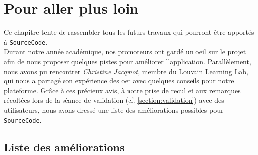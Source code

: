 \chapter{Pour aller plus loin}
\label{chapter:pourAllerPlusLoin}

Ce chapitre tente de rassembler tous les futurs travaux qui pourront être apportés à \texttt{SourceCode}.\\

Durant notre année académique, nos promoteurs ont gardé un oeil sur le projet afin de nous proposer quelques pistes pour améliorer l'application.
Parallèlement, nous avons pu rencontrer \textit{Christine Jacqmot}, membre du Louvain Learning Lab, qui nous a partagé son expérience des \gls{oer} avec quelques conseils pour notre plateforme. 
Grâce à ces précieux avis, à notre prise de recul et aux remarques récoltées lors de la séance de validation (cf. \ref{section:validation}) avec des utilisateurs, nous avons dressé une liste des améliorations possibles pour \texttt{SourceCode}.

\section{Liste des améliorations}

